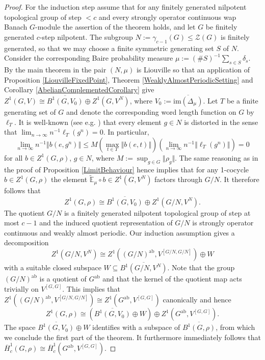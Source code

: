 \documentclass[a4paper,11pt,reqno]{amsart}
\numberwithin{equation}{section}
\theoremstyle{definition}
\theoremstyle{remark}
\theoremstyle{remark}
\begin{document}
\begin{proof}
For the induction step assume that for any finitely generated nilpotent topological group of step $<c$ and every strongly operator continuous wap Banach $G$-module the assertion of the theorem holds, and let $G$ be finitely generated $c$-step nilpotent. The subgroup $N:=\gamma_{c-1}(G)\leq\mathcal{Z}(G)$ is finitely generated, so that we may choose a finite symmetric generating set $S$ of $N$. Consider the corresponding Baire probability measure $\mu:=(\#S)^{-1}\sum_{s\in S}\delta_{s}$. By the main theorem in \cite{Shanbhag91} the pair $(N,\mu)$ is Liouville so that an application of Proposition \ref{LiouvilleFixedPoint}, Theorem \ref{WeaklyAlmostPeriodicSetting} and Corollary \ref{AbelianComplementedCorollary} give $Z^{1}(G,V)\cong\overline{B^{1}(G,V_{0})}\oplus Z^{1}(G,V^{N})$, where $V_{0}:=\overline{\text{im}(\Delta_{\mu})}$. Let $T$ be a finite generating set of $G$ and denote the corresponding word length function on $G$ by $\ell_{T}$. It is well-known (see e.g. \cite[Lemma 14.15]{Drutu18}) that every element $g\in N$ is distorted in the sense that $\lim_{n\rightarrow\infty}n^{-1}\ell_{T}(g^{n})=0$. In particular, 
\[
\lim_{n\rightarrow\infty}n^{-1}\left\Vert b(e,g^{n})\right\Vert \leq M\left(\max_{t\in T}\Vert b(e,t)\Vert\right)\left(\lim_{n\rightarrow\infty}n^{-1}\left\Vert \ell_{T}(g^{n})\right\Vert \right)=0
\]
for all $b\in Z^{1}(G,\rho)$, $g\in N$, where $M:=\sup_{g\in G}\Vert\rho_{g}\Vert$. The same reasoning as in the proof of Proposition \ref{LimitBehaviour} hence implies that for any 1-cocycle $b\in Z^{1}(G,\rho)$ the element $\widetilde{\mathbb{E}}_{\mu}\circ b\in Z^{1}(G,V^{N})$ factors through $G/N$. It therefore follows that 
\[
Z^{1}(G,\rho)\cong\overline{B^{1}(G,V_{0})}\oplus Z^{1}(G/N,V^{N}).
\]
The quotient $G/N$ is a finitely generated nilpotent topological group of step at most $c-1$ and the induced quotient representation of $G/N$ is strongly operator continuous and weakly almost periodic. Our induction assumption gives a decomposition 
\[
Z^{1}(G/N,V^{N})\cong Z^{1}\left((G/N)^{\text{ab}},V^{[G/N,G/N]}\right)\oplus W
\]
with a suitable closed subspace $W\subseteq\overline{B^{1}\left(G/N,V^{N}\right)}$. Note that the group $(G/N)^{\text{ab}}$ is a quotient of $G^{\text{ab}}$ and that the kernel of the quotient map acts trivially on $V^{[G,G]}$. This implies that $Z^{1}\left((G/N)^{\text{ab}},V^{[G/N,G/N]}\right)\cong Z^{1}(G^{\text{ab}},V^{[G,G]})$ canonically and hence 
\[
Z^{1}(G,\rho)\cong\left(\overline{B^{1}(G,V_{0})}\oplus W\right)\oplus Z^{1}(G^{\text{ab}},V^{[G,G]}).
\]
The space $\overline{B^{1}(G,V_{0})}\oplus W$ identifies with a subspace of $\overline{B^{1}(G,\rho)}$, from which we conclude the first part of the theorem. It furthermore immediately follows that $\overline{H}_{c}^{1}(G,\rho)\cong\overline{H}_{c}^{1}(G^{\text{ab}},V^{[G,G]})$.


\end{proof}
\end{document}
